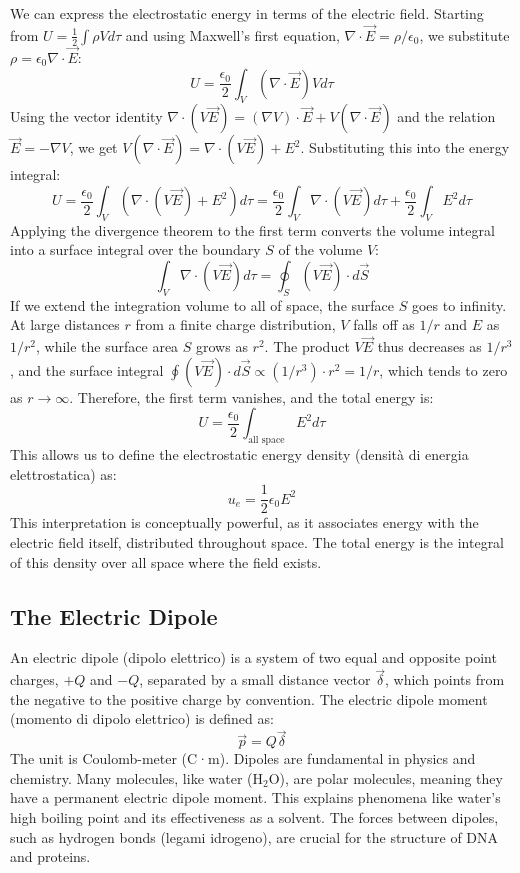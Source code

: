 We can express the electrostatic energy in terms of the electric field. Starting from \(U = \frac{1}{2} \int \rho V d\tau\) and using Maxwell's first equation, \(\nabla \cdot \vec{E} = \rho / \epsilon_0\), we substitute \(\rho = \epsilon_0 \nabla \cdot \vec{E}\):
\[ U = \frac{\epsilon_0}{2} \int_V (\nabla \cdot \vec{E}) V d\tau \]
Using the vector identity \(\nabla \cdot (V\vec{E}) = (\nabla V) \cdot \vec{E} + V(\nabla \cdot \vec{E})\) and the relation \(\vec{E} = -\nabla V\), we get \(V(\nabla \cdot \vec{E}) = \nabla \cdot (V\vec{E}) + E^2\). Substituting this into the energy integral:
\[ U = \frac{\epsilon_0}{2} \int_V (\nabla \cdot (V\vec{E}) + E^2) d\tau = \frac{\epsilon_0}{2} \int_V \nabla \cdot (V\vec{E}) d\tau + \frac{\epsilon_0}{2} \int_V E^2 d\tau \]
Applying the divergence theorem to the first term converts the volume integral into a surface integral over the boundary \(S\) of the volume \(V\):
\[ \int_V \nabla \cdot (V\vec{E}) d\tau = \oint_S (V\vec{E}) \cdot d\vec{S} \]
If we extend the integration volume to all of space, the surface \(S\) goes to infinity. At large distances \(r\) from a finite charge distribution, \(V\) falls off as \(1/r\) and \(E\) as \(1/r^2\), while the surface area \(S\) grows as \(r^2\). The product \(V\vec{E}\) thus decreases as \(1/r^3\), and the surface integral \(\oint (V\vec{E}) \cdot d\vec{S} \propto (1/r^3) \cdot r^2 = 1/r\), which tends to zero as \(r \to \infty\).
Therefore, the first term vanishes, and the total energy is:
\[ U = \frac{\epsilon_0}{2} \int_{\text{all space}} E^2 d\tau \]
This allows us to define the electrostatic energy density (densità di energia elettrostatica) as:
\[ u_e = \frac{1}{2} \epsilon_0 E^2 \]
This interpretation is conceptually powerful, as it associates energy with the electric field itself, distributed throughout space. The total energy is the integral of this density over all space where the field exists.

\subsection*{The Electric Dipole}

An electric dipole (dipolo elettrico) is a system of two equal and opposite point charges, \(+Q\) and \(-Q\), separated by a small distance vector \(\vec{\delta}\), which points from the negative to the positive charge by convention.
The electric dipole moment (momento di dipolo elettrico) is defined as:
\[ \vec{p} = Q \vec{\delta} \]
The unit is Coulomb-meter (C·m). Dipoles are fundamental in physics and chemistry. Many molecules, like water (H\(_2\)O), are polar molecules, meaning they have a permanent electric dipole moment. This explains phenomena like water's high boiling point and its effectiveness as a solvent. The forces between dipoles, such as hydrogen bonds (legami idrogeno), are crucial for the structure of DNA and proteins.

